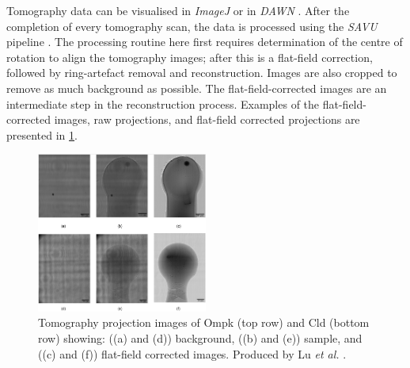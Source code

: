 

Tomography data can be visualised in \textit{ImageJ} \cite{Schroeder2020} or in \textit{DAWN} \cite{Basham2015}. After the completion of every tomography scan, the data is processed using the \textit{SAVU} pipeline \cite{Kazantsev2022}. The processing routine here first requires determination of the centre of rotation to align the tomography images; after this is a flat-field correction, followed by ring-artefact removal and reconstruction. Images are also cropped to remove as much background as possible. The flat-field-corrected images are an intermediate step in the reconstruction process. Examples of the flat-field-corrected images, raw projections, and flat-field corrected projections are presented in \cref{fig:tomo projections}. 

\begin{figure}
    \centering
    \includegraphics[width = 0.5\textwidth]{images/Tomo projection images CLD and Ompk high quality.png}
    \caption{Tomography projection images of Ompk (top row) and Cld (bottom row) showing: ((a) and (d)) background,  ((b) and (e)) sample, and ((c) and (f)) flat-field corrected images. Produced by Lu \textit{et al.} \cite{Lu2024}.}
    \label{fig:tomo projections}
\end{figure}

